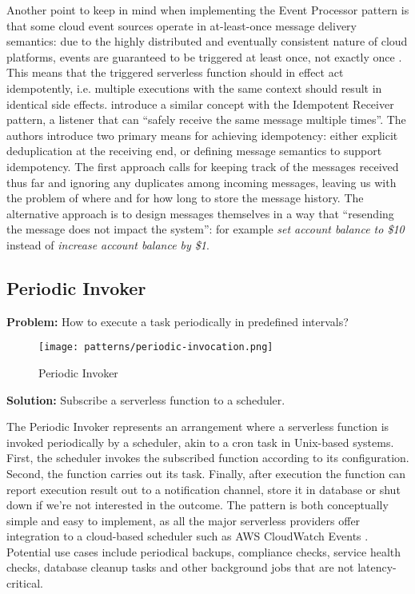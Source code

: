 Another point to keep in mind when implementing the Event Processor pattern is that some cloud event sources operate in at-least-once message delivery semantics: due to the highly distributed and eventually consistent nature of cloud platforms, events are guaranteed to be triggered at least once, not exactly once \parencite{awslambda0218}. This means that the triggered serverless function should in effect act idempotently, i.e. multiple executions with the same context should result in identical side effects. \textcite{hohpe2004enterprise} introduce a similar concept with the Idempotent Receiver pattern, a listener that can ``safely receive the same message multiple times''. The authors introduce two primary means for achieving idempotency: either explicit deduplication at the receiving end, or defining message semantics to support idempotency. The first approach calls for keeping track of the messages received thus far and ignoring any duplicates among incoming messages, leaving us with the problem of where and for how long to store the message history. The alternative approach is to design messages themselves in a way that ``resending the message does not impact the system'': for example \textit{set account balance to \$10} instead of \textit{increase account balance by \$1}.

\subsection{Periodic Invoker} \label{subsec:periodicInvocation}

\textbf{Problem:} How to execute a task periodically in predefined intervals?

\begin{figure}[h]
  \centering
  \texttt{[image: patterns/periodic-invocation.png]}
  \caption{Periodic Invoker}
  \label{fig:patternPeriodicInvocation}
\end{figure}

\textbf{Solution:} Subscribe a serverless function to a scheduler.

The Periodic Invoker represents an arrangement where a serverless function is invoked periodically by a scheduler, akin to a cron task in Unix-based systems. First, the scheduler invokes the subscribed function according to its configuration. Second, the function carries out its task. Finally, after execution the function can report execution result out to a notification channel, store it in database or shut down if we're not interested in the outcome. The pattern is both conceptually simple and easy to implement, as all the major serverless providers offer integration to a cloud-based scheduler such as AWS CloudWatch Events \parencite{awslambda0218}. Potential use cases include periodical backups, compliance checks, service health checks, database cleanup tasks and other background jobs that are not latency-critical. \parencite{hong18securingviaserverlesspatterns}

